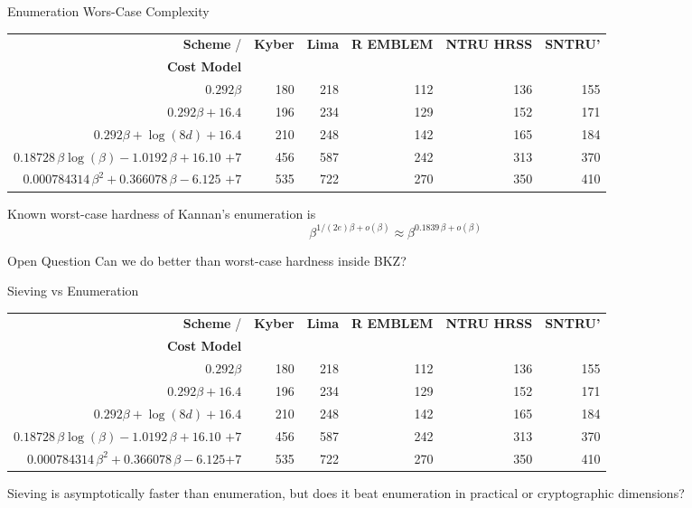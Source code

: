 \documentclass[xcolor=table,10pt,aspectratio=169]{beamer}
\def\enumquadfit{\(0.000784314\, \beta^2 + 0.366078\,\beta - 6.125\)}
\def\enumlinfit{\(0.18728\, \beta \log(\beta) - 1.0192\,\beta + 16.10\)}
\def\robl{\rowcolor{DarkBlue!20}}
\def\rore{\rowcolor{DarkRed!20}}
\def\rogr{\rowcolor{gray!20}}
\begin{document}
\begin{frame}[label={sec:org33987a5}]{Enumeration Wors-Case Complexity}
\begin{scriptsize}
\begin{center}
\begin{tabular}{rrrrrr}
\textbf{Scheme}      / & \textbf{Kyber} & \textbf{Lima} & \textbf{R EMBLEM} & \textbf{NTRU HRSS} & \textbf{SNTRU’}\\
\textbf{Cost Model} &  &  &  &  & \\
\hline
\(0.292\beta\) & 180 & 218 & 112 & 136 & 155\\
\(0.292\beta + 16.4\) & 196 & 234 & 129 & 152 & 171\\
\(0.292\beta + \log(8d) + 16.4\) & 210 & 248 & 142 & 165 & 184\\
\rogr \enumlinfit{} \(+ 7\) & 456 & 587 & 242 & 313 & 370\\
\rogr \enumquadfit{} \(+ 7\) & 535 & 722 & 270 & 350 & 410\\
\end{tabular}

\end{center}
\end{scriptsize}

Known worst-case hardness of Kannan’s enumeration is  \[\beta^{1/(2e) \beta + o(\beta)} \approx \beta^{0.1839\, \beta + o(\beta)}\] 

\begin{block}{Open Question}
Can we do better than worst-case hardness inside BKZ?
\end{block}
\end{frame}

\begin{frame}[label={sec:orgcda224f}]{Sieving vs Enumeration}
\begin{scriptsize}
\begin{center}
\begin{tabular}{rrrrrr}
\textbf{Scheme}      / & \textbf{Kyber} & \textbf{Lima} & \textbf{R EMBLEM} & \textbf{NTRU HRSS} & \textbf{SNTRU’}\\
\textbf{Cost Model} &  &  &  &  & \\
\hline
\rore  \(0.292\beta\) & 180 & 218 & 112 & 136 & 155\\
\rore \(0.292\beta + 16.4\) & 196 & 234 & 129 & 152 & 171\\
\rore \(0.292\beta + \log(8d) + 16.4\) & 210 & 248 & 142 & 165 & 184\\
\robl \enumlinfit{} \(+ 7\) & 456 & 587 & 242 & 313 & 370\\
\robl  \enumquadfit \(+ 7\) & 535 & 722 & 270 & 350 & 410\\
\end{tabular}

\end{center}
\end{scriptsize}

\begin{block}{}
Sieving is asymptotically faster than enumeration, but does it beat enumeration in practical or cryptographic dimensions?
\end{block}
\end{frame}
\end{document}
